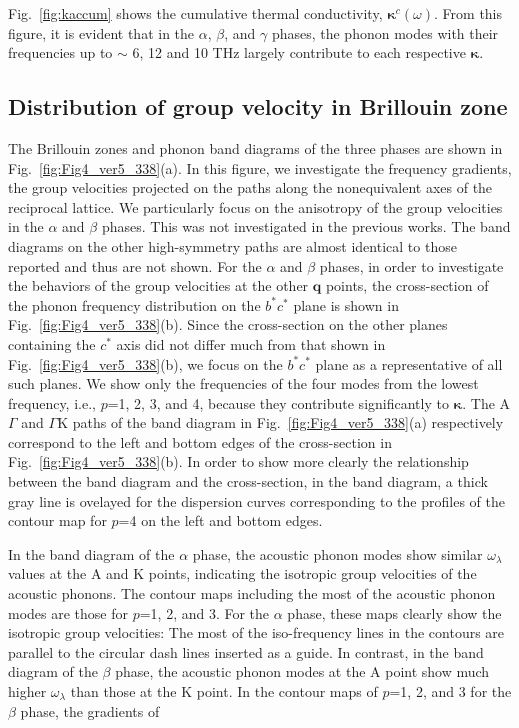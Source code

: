 \documentclass[twocolumn,amsmath,amssymb,a4paper,prb,superscriptaddress,floatfix]{revtex4-1}
\begin{document}
Fig.~\ref{fig:kaccum} shows the cumulative thermal
conductivity, $\boldsymbol{\kappa}^c(\omega)$. 
From this figure, it is evident that in the
$\alpha$, $\beta$, and $\gamma$ phases, the phonon modes with their frequencies
up to $\sim$ 6, 12 and 10 THz largely contribute to each respective
$\boldsymbol{\kappa}$. 

\subsection{Distribution of group velocity in Brillouin zone}

The Brillouin zones and phonon band diagrams of the three phases are shown in
Fig.~\ref{fig:Fig4_ver5_338}(a). In this figure, we investigate the frequency
gradients, the group velocities projected on the paths along the nonequivalent
axes of the reciprocal lattice. We particularly focus on the anisotropy of the
group velocities  in the $\alpha$ and $\beta$ phases. This was not investigated
in the previous works. The band diagrams on the other high-symmetry paths are
almost identical to those reported\cite{kuwabara,xu} and thus are not shown.
For the $\alpha$ and $\beta$ phases, in order to investigate the behaviors of
the group velocities at the other $\mathbf{q}$ points, the cross-section of the
phonon frequency  
distribution on the $b^*c^*$ plane is shown in Fig.~\ref{fig:Fig4_ver5_338}(b). Since the
cross-section on the other planes 
containing the $c^*$ axis did not differ much from that shown in 
Fig.~\ref{fig:Fig4_ver5_338}(b), we focus on the $b^*c^*$
plane as a representative of all such planes. We show only the frequencies of the 
four modes from the lowest frequency, i.e., $p$=1, 2, 3, and 4,  because they contribute significantly to
$\boldsymbol{\kappa}$.
The A$\Gamma$ and $\Gamma$K paths of the band diagram in
Fig.~\ref{fig:Fig4_ver5_338}(a) respectively correspond to the left and bottom
edges of the cross-section in Fig.~\ref{fig:Fig4_ver5_338}(b).
In order to show more clearly the relationship between the band diagram and the
cross-section, in the band diagram, a thick gray line is ovelayed for the dispersion curves
corresponding to the profiles of the contour map for $p$=4 on the left and bottom edges. 

In the band diagram of the $\alpha$ phase, the acoustic
phonon modes show similar $\omega_\lambda$ values at the A and K points, 
indicating the isotropic group velocities of the acoustic phonons.
The contour maps including the most of the acoustic phonon modes are those for $p$=1, 2, and
3. For the $\alpha$ phase, these maps clearly show the
isotropic group velocities: The most of the iso-frequency lines in the contours
are parallel to the circular dash lines inserted as a guide.  In contrast, in
the band diagram of the $\beta$ phase, the acoustic phonon modes at the A point show 
much higher $\omega_\lambda$ than those at the K point.
In the contour maps of $p$=1, 2, and 3 for the $\beta$ phase, the gradients of
\end{document}
